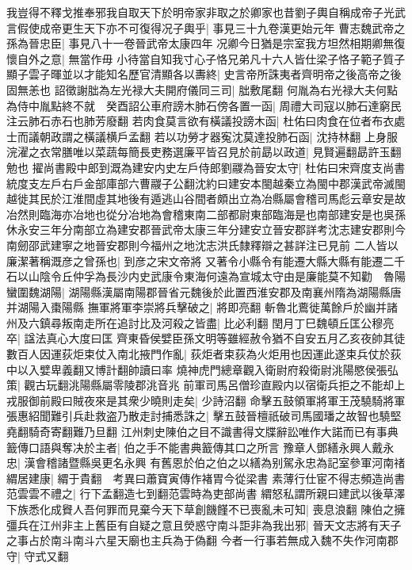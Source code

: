 我豈得不釋戈推奉邪我自取天下於明帝家非取之於卿家也昔劉子輿自稱成帝子光武言假使成帝更生天下亦不可復得况子輿乎|{
	事見三十九卷漢更始元年}
曹志魏武帝之孫為晉忠臣|{
	事見八十一卷晉武帝太康四年}
况卿今日猶是宗室我方坦然相期卿無復懷自外之意|{
	無當作毋}
小待當自知我寸心子恪兄弟凡十六人皆仕梁子恪子範子質子顯子雲子暉並以才能知名歷官清顯各以夀終|{
	史言帝所誅夷者齊明帝之後高帝之後固無恙也}
詔徵謝朏為左光禄大夫開府儀同三司|{
	朏敷尾翻}
何胤為右光禄大夫何點為侍中胤點終不就　癸酉詔公車府謗木肺石傍各置一函|{
	周禮大司寇以肺石達窮民注云肺石赤石也肺芳廢翻}
若肉食莫言欲有橫議投謗木函|{
	杜佑曰肉食在位者布衣處士而議朝政謂之橫議横戶孟翻}
若以功勞才器寃沈莫達投肺石函|{
	沈持林翻}
上身服浣濯之衣常膳唯以菜蔬每簡長吏務選廉平皆召見於前勗以政道|{
	見賢遍翻勗許玉翻勉也}
擢尚書殿中郎到溉為建安内史左戶侍郎劉鬷為晉安太守|{
	杜佑曰宋齊度支尚書統度支左戶右戶金部庫部六曹鬷子公翻沈約曰建安本閩越秦立為閩中郡漢武帝滅閩越徙其民於江淮間虛其地後有遁逃山谷間者頗出立為冶縣屬會稽司馬彪云章安是故冶然則臨海亦冶地也從分冶地為會稽東南二部都尉東部臨海是也南部建安是也吳孫休永安三年分南部立為建安郡晉武帝太康三年分建安立晉安郡詳考沈志建安郡則今南劒邵武建寧之地晉安郡則今福州之地沈志洪氏隸釋辯之甚詳注已見前}
二人皆以廉潔著稱溉彦之曾孫也|{
	到彦之宋文帝將}
又著令小縣令有能遷大縣大縣有能遷二千石以山陰令丘仲孚為長沙内史武康令東海何遠為宣城太守由是廉能莫不知勸　魯陽蠻圍魏湖陽|{
	湖陽縣漢屬南陽郡晉省元魏後於此置西淮安郡及南襄州隋為湖陽縣唐并湖陽入棗陽縣}
撫軍將軍李崇將兵擊破之|{
	將即亮翻}
斬魯北鷰徙萬餘戶於幽并諸州及六鎮尋叛南走所在追討比及河殺之皆盡|{
	比必利翻}
閏月丁巳魏頓丘匡公穆亮卒|{
	諡法真心大度曰匡}
齊東昏侯嬖臣孫文明等雖經赦令猶不自安五月乙亥夜帥其徒數百人因運荻炬束仗入南北掖門作亂|{
	荻炬者束荻為火炬用也因運此遂束兵仗於荻中以入嬖卑義翻又博計翻帥讀曰率}
燒神虎門總章觀入衛尉府殺衛尉洮陽愍侯張弘策|{
	觀古玩翻洮陽縣屬零陵郡洮音兆}
前軍司馬呂僧珍直殿内以宿衛兵拒之不能却上戎服御前殿曰賊夜來是其衆少曉則走矣|{
	少詩沼翻}
命擊五鼓領軍將軍王茂驍騎將軍張惠紹聞難引兵赴救盗乃散走討捕悉誅之|{
	擊五鼓晉檀祇破司馬國璠之故智也驍堅堯翻騎奇寄翻難乃旦翻}
江州刺史陳伯之目不識書得文牒辭訟唯作大諾而已有事典籖傳口語與奪决於主者|{
	伯之手不能書典籖傳其口之所言}
豫章人鄧繕永興人戴永忠|{
	漢會稽諸暨縣吳更名永興}
有舊恩於伯之伯之以繕為别駕永忠為記室參軍河南禇緭居建康|{
	緭于貴翻　考異曰蕭寶寅傳作褚胃今從梁書}
素薄行仕宦不得志頻造尚書范雲雲不禮之|{
	行下孟翻造七到翻范雲時為吏部尚書}
緭怒私謂所親曰建武以後草澤下族悉化成䝿人吾何罪而見棄今天下草創饑饉不已喪亂未可知|{
	喪息浪翻}
陳伯之擁彊兵在江州非主上舊臣有自疑之意且熒惑守南斗詎非為我出邪|{
	晉天文志將有天子之事占於南斗南斗六星天廟也主兵為于偽翻}
今者一行事若無成入魏不失作河南郡守|{
	守式又翻}

